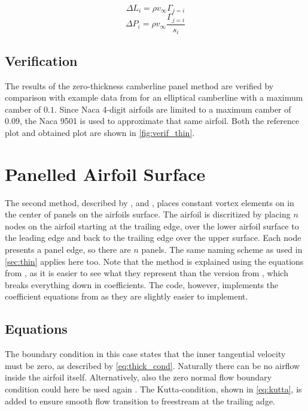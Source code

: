 \begin{equation}
\label{eq:thin_lift}
\Delta L_i = \rho v_\infty \Gamma_{j=i}
\end{equation}
\begin{equation}
\label{eq:thin_press}
\Delta P_i = \rho v_\infty \frac{\Gamma_{j=i}}{s_i}
\end{equation}

\subsection{Verification}
The results of the zero-thickness camberline panel method are verified by
comparison with example data from \citeauthor{katz_plotkin} for an elliptical
camberline with a maximum camber of $0.1$. Since Naca 4-digit airfoils are
limited to a maximum camber of $0.09$, the Naca 9501 is used to approximate that
same airfoil. Both the reference plot and obtained plot are shown in \autoref{fig:verif_thin}.


\section{Panelled Airfoil Surface}
\label{sec:thick}
The second method, described by \citeauthor{katz_plotkin}\cite{katz_plotkin},
and \citeauthor{kuethe_chow_1998}\cite{kuethe_chow_1998}, places constant vortex
elements on in the center of panels on the airfoils surface. The airfoil is
discritized by placing $n$ nodes on the airfoil starting at the trailing edge,
over the lower airfoil surface to the leading edge and back to the trailing edge
over the upper surface. Each node presents a panel edge, so there are $n$
panels. The same naming scheme as used in \autoref{sec:thin} applies here too.
Note that the method is explained using the equations from
\citeauthor{katz_plotkin}\cite{katz_plotkin}, as it is easier to see what they
represent than the version from
\citeauthor{kuethe_chow_1998}\cite{kuethe_chow_1998}, which breaks everything
down in coefficients. The code, however, implements the coefficient equations
from \citeauthor{kuethe_chow_1998}\cite{kuethe_chow_1998} as they are slightly
easier to implement.


\subsection{Equations}
\label{ssec:eq_thick}
The boundary condition in this case states that the inner tangential velocity
must be zero, as described by \autoref{eq:thick_cond}\cite{katz_plotkin}.
Naturally there can be no airflow inside the airfoil itself. Alternatively, also
the zero normal flow boundary condition could here be used again
\cite{kuethe_chow_1998}. The Kutta-condition, shown in \autoref{eq:kutta}, is
added to ensure smooth flow transition to freestream at the trailing adge.

